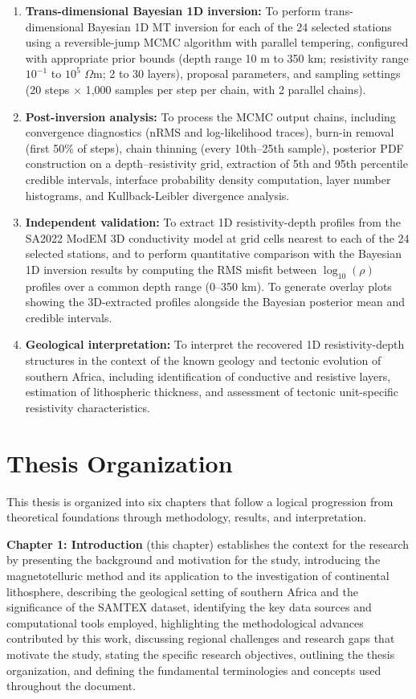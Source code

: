 \begin{enumerate}
    \item \textbf{Trans-dimensional Bayesian 1D inversion:} To perform trans-dimensional Bayesian 1D MT inversion for each of the 24 selected stations using a reversible-jump MCMC algorithm with parallel tempering, configured with appropriate prior bounds (depth range 10 m to 350 km; resistivity range $10^{-1}$ to $10^{5}$ $\Omega$m; 2 to 30 layers), proposal parameters, and sampling settings (20 steps $\times$ 1{,}000 samples per step per chain, with 2 parallel chains).

    \item \textbf{Post-inversion analysis:} To process the MCMC output chains, including convergence diagnostics (nRMS and log-likelihood traces), burn-in removal (first 50\% of steps), chain thinning (every 10th--25th sample), posterior PDF construction on a depth--resistivity grid, extraction of 5th and 95th percentile credible intervals, interface probability density computation, layer number histograms, and Kullback-Leibler divergence analysis.

    \item \textbf{Independent validation:} To extract 1D resistivity-depth profiles from the SA2022 ModEM 3D conductivity model at grid cells nearest to each of the 24 selected stations, and to perform quantitative comparison with the Bayesian 1D inversion results by computing the RMS misfit between $\log_{10}(\rho)$ profiles over a common depth range (0--350 km). To generate overlay plots showing the 3D-extracted profiles alongside the Bayesian posterior mean and credible intervals.

    \item \textbf{Geological interpretation:} To interpret the recovered 1D resistivity-depth structures in the context of the known geology and tectonic evolution of southern Africa, including identification of conductive and resistive layers, estimation of lithospheric thickness, and assessment of tectonic unit-specific resistivity characteristics.
\end{enumerate}


\section*{Thesis Organization}

This thesis is organized into six chapters that follow a logical progression from theoretical foundations through methodology, results, and interpretation.

\textbf{Chapter 1: Introduction} (this chapter) establishes the context for the research by presenting the background and motivation for the study, introducing the magnetotelluric method and its application to the investigation of continental lithosphere, describing the geological setting of southern Africa and the significance of the SAMTEX dataset, identifying the key data sources and computational tools employed, highlighting the methodological advances contributed by this work, discussing regional challenges and research gaps that motivate the study, stating the specific research objectives, outlining the thesis organization, and defining the fundamental terminologies and concepts used throughout the document.

